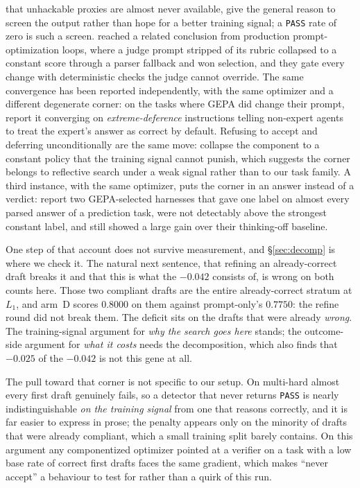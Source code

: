 \documentclass[11pt]{article}
\begin{document}
that unhackable proxies are almost never available, give the general reason to screen the output
rather than hope for a better training signal; a \texttt{PASS} rate of zero is such a screen.
\citet{wahi2026judge} reached a related conclusion from production prompt-optimization loops, where
a judge prompt stripped of its rubric collapsed to a constant score through a parser fallback and
won selection, and they gate every change with deterministic checks the judge cannot override. The same
convergence has been reported independently, with the same optimizer and
a different degenerate corner: on the tasks where GEPA did change their prompt,
\citet{pappu2026multiagent} report it converging on \emph{extreme-deference} instructions telling
non-expert agents to treat the expert's answer as correct by default. Refusing to accept and
deferring unconditionally are the same move: collapse the component to a constant policy that
the training signal cannot punish, which suggests the corner belongs to reflective search under a
weak signal rather than to our task family. A third instance, with the same optimizer, puts the
corner in an answer instead of a verdict: \citet{xu2026harnessrepairv3} report two GEPA-selected
harnesses that gave one label on almost every parsed answer of a prediction task, were not
detectably above the strongest constant label, and still showed a large gain over their
thinking-off baseline.

One step of that account does not survive measurement, and \S\ref{sec:decomp} is where we
check it. The natural next sentence, that refining an already-correct draft breaks it and
that this is what the $-0.042$ consists of, is wrong on both counts here. Those two
compliant drafts are the entire already-correct stratum at $L_1$, and arm~D scores $0.8000$ on
them against prompt-only's $0.7750$: the refine round did not break them. The deficit sits on
the drafts that were already \emph{wrong}. The training-signal argument for \emph{why the
search goes here} stands; the outcome-side argument for \emph{what it costs} needs the
decomposition, which also finds that $-0.025$ of the $-0.042$ is not this gene at all.

The pull toward that corner is not specific to our setup. On multi-hard almost every first
draft genuinely fails, so a detector that never returns \texttt{PASS} is nearly
indistinguishable \emph{on the training signal} from one that reasons correctly, and it is far
easier to express in prose; the penalty appears only on the minority of drafts that were already
compliant, which a small training split barely contains. On this argument any componentized
optimizer pointed at a verifier on a task with a low base rate of correct first drafts faces the
same gradient, which makes ``never accept'' a behaviour to test for rather than a quirk of this
run.
\end{document}
